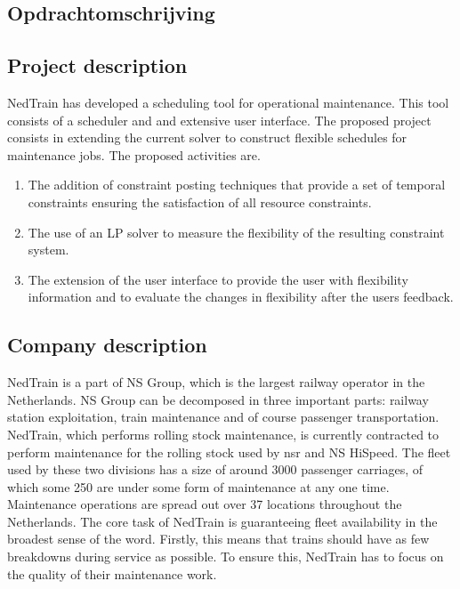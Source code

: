 \begin{appendices}

\section{Opdrachtomschrijving} \label{app:A}
\subsection*{Project description}
NedTrain has developed a scheduling tool for operational maintenance. This tool consists of a scheduler and and extensive user interface. The proposed project consists in extending the current solver to construct flexible schedules for maintenance jobs. The proposed activities are.

\begin{enumerate}
	\item The addition of constraint posting techniques that provide a set of temporal constraints ensuring the satisfaction of all resource constraints.
	\item The use of an LP solver to measure the flexibility of the resulting constraint system.
	\item The extension of the user interface to provide the user with flexibility information and to evaluate the changes in flexibility after the users feedback.
\end{enumerate}

\subsection*{Company description}

NedTrain is a part of NS Group, which is the largest railway operator in the Netherlands. NS Group can be decomposed in three important parts: railway station exploitation, train maintenance and of course passenger transportation. NedTrain, which performs rolling stock maintenance, is currently contracted to perform maintenance for the rolling stock used by nsr and NS HiSpeed. The fleet used by these two divisions has a size of around 3000 passenger carriages, of which some 250 are under some form of maintenance at any one time. Maintenance operations are spread out over 37 locations throughout the Netherlands. The core task of NedTrain is guaranteeing fleet availability in the broadest sense of the word. Firstly, this means that trains should have as few breakdowns during service as possible. To ensure this, NedTrain has to focus on the quality of their maintenance work.


\end{appendices}
